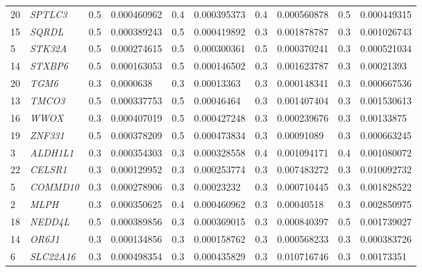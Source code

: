 \begin{refsection}
\begin{otherlanguage}{english}
\begin{scriptsize}
\begin{longtable}{llllllllll}
20 & \cellcolor[HTML]{CBCEFB}\textit{SPTLC3} & 0.5 & 0.000460962 & 0.4 & 0.000395373 & 0.4 & 0.000560878 & 0.5 & \cellcolor[HTML]{CBCEFB}0.000449315 \\
15 & \cellcolor[HTML]{CBCEFB}\textit{SQRDL} & 0.5 & 0.000389243 & 0.5 & 0.000419892 & 0.3 & 0.001878787 & 0.3 & 0.001026743 \\
5 & \cellcolor[HTML]{CBCEFB}\textit{STK32A} & 0.5 & 0.000274615 & 0.5 & 0.000300361 & 0.5 & \cellcolor[HTML]{CBCEFB}0.000370241 & 0.3 & 0.000521034 \\
14 & \cellcolor[HTML]{CBCEFB}\textit{STXBP6} & 0.5 & 0.000163053 & 0.5 & 0.000146502 & 0.3 & 0.001623787 & 0.3 & \cellcolor[HTML]{CBCEFB}0.00021393 \\
20 & \cellcolor[HTML]{CBCEFB}\textit{TGM6} & 0.3 & 0.0000638 & 0.3 & 0.00013363 & 0.3 & \cellcolor[HTML]{CBCEFB}0.000148341 & 0.3 & 0.000667536 \\
13 & \cellcolor[HTML]{CBCEFB}\textit{TMCO3} & 0.5 & 0.000337753 & 0.5 & 0.00046464 & 0.3 & 0.001407404 & 0.3 & 0.001530613 \\
16 & \cellcolor[HTML]{CBCEFB}\textit{WWOX} & 0.3 & 0.000407019 & 0.5 & 0.000427248 & 0.3 & \cellcolor[HTML]{CBCEFB}0.000239676 & 0.3 & 0.00133875 \\
19 & \cellcolor[HTML]{CBCEFB}\textit{ZNF331} & 0.5 & 0.000378209 & 0.5 & 0.000473834 & 0.3 & 0.00091089 & 0.3 & 0.000663245 \\
3 & \cellcolor[HTML]{CBCEFB}\textit{ALDH1L1} & 0.3 & 0.000354303 & 0.3 & 0.000328558 & 0.4 & 0.001094171 & 0.4 & 0.001080072 \\
22 & \cellcolor[HTML]{CBCEFB}\textit{CELSR1} & 0.3 & 0.000129952 & 0.3 & 0.000253774 & 0.3 & 0.007483272 & 0.3 & 0.010092732 \\
5 & \cellcolor[HTML]{CBCEFB}\textit{COMMD10} & 0.3 & 0.000278906 & 0.3 & 0.00023232 & 0.3 & 0.000710445 & 0.3 & 0.001828522 \\
2 & \cellcolor[HTML]{CBCEFB}\textit{MLPH} & 0.3 & 0.000350625 & 0.4 & 0.000460962 & 0.3 & \cellcolor[HTML]{CBCEFB}0.00040518 & 0.3 & 0.002850975 \\
18 & \cellcolor[HTML]{CBCEFB}\textit{NEDD4L} & 0.5 & 0.000389856 & 0.3 & 0.000369015 & 0.3 & 0.000840397 & 0.5 & 0.001739027 \\
14 & \cellcolor[HTML]{CBCEFB}\textit{OR6J1} & 0.3 & 0.000134856 & 0.3 & 0.000158762 & 0.3 & 0.000568233 & 0.3 & \cellcolor[HTML]{CBCEFB}0.000383726 \\
6 & \cellcolor[HTML]{CBCEFB}\textit{SLC22A16} & 0.3 & 0.000498354 & 0.3 & 0.000435829 & 0.3 & 0.010716746 & 0.3 & 0.00173351 \\

\end{longtable}
\end{scriptsize}
\end{otherlanguage}
\end{refsection}
